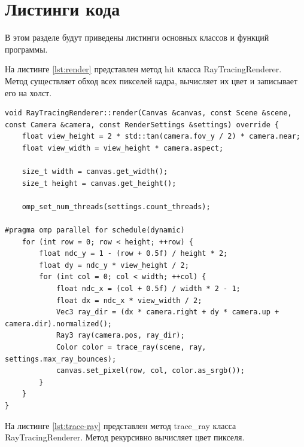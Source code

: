 \section{Листинги кода}
В этом разделе будут приведены листинги основных классов и функций программы.

На листинге \ref{lst:render} представлен метод hit класса RayTracingRenderer. Метод существляет обход всех пикселей кадра, вычисляет их цвет и записывает его на холст.

\begin{lstlisting}[caption={Метод render класса RayTracingRenderer}, label={lst:render}]
void RayTracingRenderer::render(Canvas &canvas, const Scene &scene, const Camera &camera, const RenderSettings &settings) override {
    float view_height = 2 * std::tan(camera.fov_y / 2) * camera.near;
    float view_width = view_height * camera.aspect;

    size_t width = canvas.get_width();
    size_t height = canvas.get_height();

    omp_set_num_threads(settings.count_threads);

#pragma omp parallel for schedule(dynamic)
    for (int row = 0; row < height; ++row) {
        float ndc_y = 1 - (row + 0.5f) / height * 2;
        float dy = ndc_y * view_height / 2;
        for (int col = 0; col < width; ++col) {
            float ndc_x = (col + 0.5f) / width * 2 - 1;
            float dx = ndc_x * view_width / 2;
            Vec3 ray_dir = (dx * camera.right + dy * camera.up + camera.dir).normalized();
            Ray3 ray(camera.pos, ray_dir);
            Color color = trace_ray(scene, ray, settings.max_ray_bounces);
            canvas.set_pixel(row, col, color.as_srgb());
        }
    }
}
\end{lstlisting}

На листинге \ref{lst:trace-ray} представлен метод trace\_ray класса RayTracingRenderer. Метод рекурсивно вычисляет цвет пикселя.

